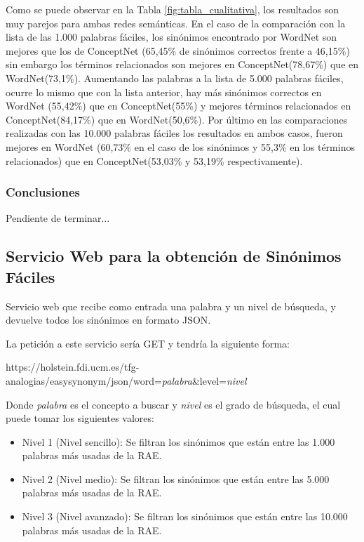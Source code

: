 Como se puede observar en la Tabla \ref{fig:tabla_cualitativa}, los resultados son muy parejos para ambas redes semánticas. En el caso de la comparación con la lista de las 1.000 palabras fáciles, los sinónimos encontrado por WordNet son mejores que los de ConceptNet (65,45\% de sinónimos correctos frente a 46,15\%) sin embargo los términos relacionados son mejores en ConceptNet(78,67\%) que en WordNet(73,1\%). Aumentando las palabras a la lista de 5.000 palabras fáciles, ocurre lo mismo que con la lista anterior, hay más sinónimos correctos en WordNet (55,42\%) que en ConceptNet(55\%) y mejores términos relacionados en ConceptNet(84,17\%) que en WordNet(50,6\%). Por último en las comparaciones realizadas con las 10.000 palabras fáciles los resultados en ambos casos, fueron mejores en WordNet (60,73\% en el caso de los sinónimos y 55,3\% en los términos relacionados) que en ConceptNet(53,03\% y 53,19\% respectivamente).


\subsubsection{Conclusiones}
\label{sssec:conclusionPruebas}

Pendiente de terminar...

 


\subsection{Servicio Web  para la obtención de  Sinónimos Fáciles}
\label{cap:subsec:sw_sinonimosfaciles}

Servicio web que recibe como entrada una palabra y un nivel de búsqueda, y devuelve todos los sinónimos en formato JSON. 

La petición a este servicio sería GET y tendría la siguiente forma:

https://holstein.fdi.ucm.es/tfg-analogias/easysynonym/json/word=\textit{palabra}\&level=\textit{nivel}

Donde \textit{palabra} es el concepto a buscar y \textit{nivel} es el grado de búsqueda, el cual puede tomar los siguientes valores:
\begin{itemize}
	\item Nivel 1 (Nivel sencillo): Se filtran los sinónimos que están entre las 1.000 palabras más usadas de la RAE.
	\item Nivel 2 (Nivel medio): Se filtran los sinónimos que están entre las 5.000 palabras más usadas de la RAE.
	\item Nivel 3 (Nivel avanzado): Se filtran los sinónimos que están entre las 10.000 palabras más usadas de la RAE.
\end{itemize}
 
